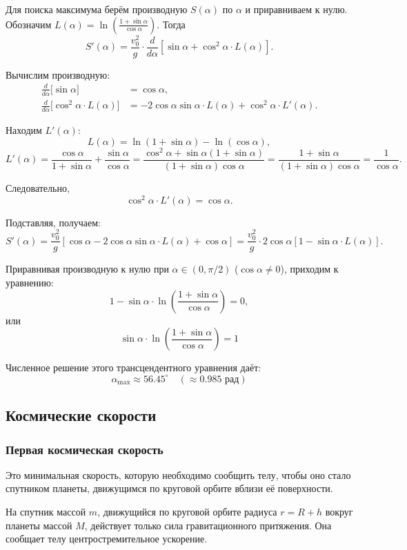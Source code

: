 Для поиска максимума берём производную $S(\alpha)$ по $\alpha$ и приравниваем к нулю. Обозначим $L(\alpha) = \ln\left( \frac{1+\sin\alpha}{\cos\alpha} \right)$. Тогда
\[
S'(\alpha) = \frac{v_0^2}{g} \cdot \frac{d}{d\alpha}\left[ \sin\alpha + \cos^2\alpha \cdot L(\alpha) \right].
\]

Вычислим производную:
\begin{align*}
\frac{d}{d\alpha}\big[\sin\alpha\big] &= \cos\alpha, \\
\frac{d}{d\alpha}\big[\cos^2\alpha \cdot L(\alpha)\big] &= -2\cos\alpha\sin\alpha \cdot L(\alpha) + \cos^2\alpha \cdot L'(\alpha).
\end{align*}

Находим $L'(\alpha)$:
\[
L(\alpha) = \ln(1+\sin\alpha) - \ln(\cos\alpha),
\]
\[
L'(\alpha) = \frac{\cos\alpha}{1+\sin\alpha} + \frac{\sin\alpha}{\cos\alpha} 
= \frac{\cos^2\alpha + \sin\alpha(1+\sin\alpha)}{(1+\sin\alpha)\cos\alpha}
= \frac{1 + \sin\alpha}{(1+\sin\alpha)\cos\alpha} = \frac{1}{\cos\alpha}.
\]

Следовательно,
\[
\cos^2\alpha \cdot L'(\alpha) = \cos\alpha.
\]

Подставляя, получаем:
\[
S'(\alpha) = \frac{v_0^2}{g} \left[ \cos\alpha - 2\cos\alpha\sin\alpha \cdot L(\alpha) + \cos\alpha \right]
= \frac{v_0^2}{g} \cdot 2\cos\alpha \left[ 1 - \sin\alpha \cdot L(\alpha) \right].
\]

Приравнивая производную к нулю при $\alpha \in (0, \pi/2)$ ($\cos\alpha \neq 0$), приходим к уравнению:
\[
1 - \sin\alpha \cdot \ln \left( \frac{1 + \sin \alpha}{\cos \alpha} \right) = 0,
\]
или
\[
\boxed{\sin\alpha \cdot \ln \left( \frac{1 + \sin \alpha}{\cos \alpha} \right) = 1}
\]

Численное решение этого трансцендентного уравнения даёт:
\[
\boxed{\alpha_{\max} \approx 56.45^\circ \quad (\approx 0.985 \text{ рад})}
\]

\subsection{Космические скорости}

\subsubsection{Первая космическая скорость}
Это минимальная скорость, которую необходимо сообщить телу, чтобы оно стало спутником планеты, движущимся по круговой орбите вблизи её поверхности.

На спутник массой $m$, движущийся по круговой орбите радиуса $r = R + h$ вокруг планеты массой $M$, действует только сила гравитационного притяжения. Она сообщает телу центростремительное ускорение.

